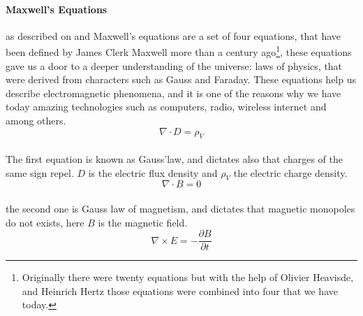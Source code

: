\documentclass{article}
\begin{document}
\paragraph{}



\paragraph{Maxwell's Equations} as described on \cite{serway_physics_2019} and \cite{fleisch_students_2008} Maxwell's equations are a set of four equations, that have been defined by James Clerk Maxwell more than a century ago\footnote{Originally there were twenty equations but with the help of Olivier Heavisde, and Heinrich Hertz those equations were combined into four that we have today.}, these equations gave us a door to a deeper understanding of the universe: laws of physics, that were derived from characters such as Gauss and Faraday. These equations help us describe electromagnetic phenomena, and it is one of the reasons why we have today amazing technologies such as computers, radio, wireless internet and among others.
\begin{equation}
	\nabla \cdot D = \rho_V
\end{equation}
\paragraph{}The first equation is known as Gauss'law, and dictates also that charges of the same sign repel. $D$ is the electric flux density and $\rho_V$ the electric charge density.
\begin{equation}
	\nabla \cdot B = 0
\end{equation}
\paragraph{} the second one is Gauss law of magnetism, and dictates that magnetic monopoles do not exists, here $B$ is the magnetic field.
\begin{equation}
	\nabla \times E = -\frac{\partial B}{\partial t}
\end{equation}
\end{document}
